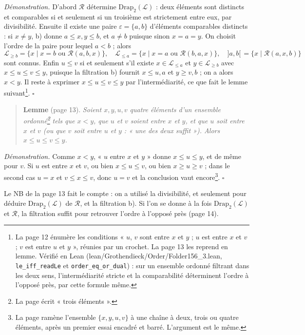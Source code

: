 \documentclass[11pt,a4paper]{article}
\begin{document}
\emph{Démonstration.} D'abord $\mathcal{R}$ détermine
$\mathrm{Drap}_{2}(\mathcal{L})$ : deux éléments sont distincts et comparables
si et seulement si un troisième est strictement entre eux, par
divisibilité. Ensuite il existe une paire $\varepsilon = \{a,b\}$ d'éléments
comparables distincts : si $x \neq y$, b) donne $a \leq x, y \leq b$, et
$a \neq b$ puisque sinon $x = a = y$. On choisit l'ordre de la paire pour
lequel $a < b$ ; alors
\[
\mathcal{L}_{\geq b} = \{x \mid x = b \text{ ou } \mathcal{R}(a,b,x)\}, \quad
\mathcal{L}_{\leq a} = \{x \mid x = a \text{ ou } \mathcal{R}(b,a,x)\}, \quad
]a,b[ \,= \{x \mid \mathcal{R}(a,x,b)\}
\]
sont connus. Enfin $u \leq v$ si et seulement s'il existe $x \in
\mathcal{L}_{\leq a}$ et $y \in \mathcal{L}_{\geq b}$ avec $x \leq u \leq v
\leq y$, puisque la filtration b) fournit $x \leq u, a$ et $y \geq v, b$ ;
on a alors $x < y$. Il reste à exprimer $x \leq u \leq v \leq y$ par
l'intermédiarité, ce que fait le lemme suivant\footnote{La page 12 énumère les
conditions « $u$, $v$ sont entre $x$ et $y$ ; $u$ est entre $x$ et $v$ ; $v$
est entre $u$ et $y$ », réunies par un crochet. La page 13 les reprend en
lemme. Vérifié en Lean (lean/Grothendieck/Order/Folder156\_3.lean,
\texttt{le\_iff\_readLe} et \texttt{order\_eq\_or\_dual}) : sur un ensemble
ordonné filtrant dans les deux sens, l'intermédiarité stricte et la
comparabilité déterminent l'ordre à l'opposé près, par cette formule même.}. \hfill$\square$

\begin{quote}
\textbf{Lemme} (page 13). \emph{Soient $x, y, u, v$ quatre éléments d'un ensemble
ordonné\footnote{La page écrit « trois éléments ».} tels que $x < y$, que $u$ et
$v$ soient entre $x$ et $y$, et que $u$ soit entre $x$ et $v$ (ou que $v$ soit
entre $u$ et $y$ : « une des deux suffit »). Alors $x \leq u \leq v \leq y$.}
\end{quote}

\emph{Démonstration.} Comme $x < y$, « $u$ entre $x$ et $y$ » donne $x \leq u
\leq y$, et de même pour $v$. Si $u$ est entre $x$ et $v$, ou bien $x \leq u
\leq v$, ou bien $x \geq u \geq v$ ; dans le second cas $u = x$ et $v \leq x
\leq v$, donc $u = v$ et la conclusion vaut encore\footnote{La page ramène
l'ensemble $\{x,y,u,v\}$ à une chaîne à deux, trois ou quatre éléments, après
un premier essai encadré et barré. L'argument est le même.}. \hfill$\square$

Le NB de la page 13 fait le compte : on a utilisé la divisibilité, et seulement
pour déduire $\mathrm{Drap}_{2}(\mathcal{L})$ de $\mathcal{R}$, et la filtration
b). Si l'on se donne à la fois $\mathrm{Drap}_{2}(\mathcal{L})$ et
$\mathcal{R}$, la filtration suffit pour retrouver l'ordre à l'opposé près
(page 14).
\end{document}

